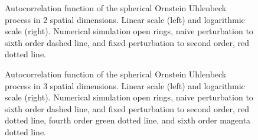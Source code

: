 \documentclass[thesis.tex]{subfiles}
\begin{document}
\begin{figure}
	\begin{center}
\end{center}
\caption{\label{fig:corr2d_highbeta} Autocorrelation function of the spherical Ornstein Uhlenbeck process in 2 spatial dimensions. Linear scale (left) and logarithmic scale (right). Numerical simulation open rings, naive perturbation to sixth order dashed line, and fixed perturbation to second order, red dotted line.}%
\end{figure}

\begin{figure}
	\begin{center}
\end{center}
\caption{\label{fig:corr2d_highbeta} Autocorrelation function of the spherical Ornstein Uhlenbeck process in 3 spatial dimensions. Linear scale (left) and logarithmic scale (right). Numerical simulation open rings, naive perturbation to sixth order dashed line, and fixed perturbation to second order, red dotted line, fourth order green dotted line, and sixth order magenta dotted line.}%
\end{figure}
\end{document}
